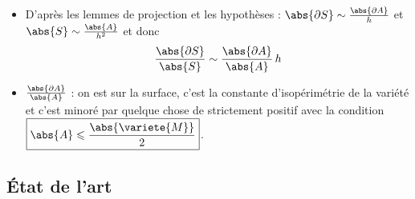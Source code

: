 {\begin{itemize}
    \[
    A = \bigcup_{i \in S} \Delta^\variete{M}_i.
    \]
    \item D'après les lemmes de projection et les hypothèses : $\abs{\partial S} \sim \frac{\abs{\partial A}}{h}$ et $\abs{S} \sim \frac{\abs{A}}{h^2}$ et donc
    \[
    \frac{\abs{\partial S}}{\abs{S}} \sim \frac{\abs{\partial A}}{\abs{A}} \, h
    \]
    \item $\frac{\abs{\partial A}}{\abs{A}}$ : on est sur la surface, c'est la constante d'isopérimétrie de la variété et c'est minoré par quelque chose de strictement positif avec la condition $\boxed{\abs{A} \leqslant \frac{\abs{\variete{M}}}{2}}$.
\end{itemize}
}

\subsection{État de l'art}